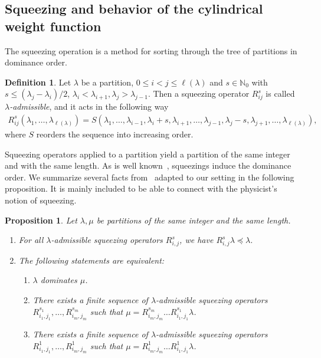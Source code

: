 \documentclass[letterpaper, DIV=17]{scrartcl}
\newtheorem{prop}[theorem]{Proposition}
\numberwithin{equation}{section}
\theoremstyle{definition}
\newtheorem{defn}{Definition}[section]
\begin{document}
\subsection{Squeezing and behavior of the cylindrical weight function}
% 
The squeezing operation is a method for sorting through the tree of partitions in dominance order.
%
\begin{defn}
Let $\lambda$ be a partition, $0\leq i <j \leq \ell(\lambda)$ and $s\in \mathbb{N}_0$ with $ s \leq (\lambda_j-\lambda_i)/2$, $\lambda_i<\lambda_{i+1}, \lambda_j >\lambda_{j-1}$. Then a squeezing operator $R_{ij}^s$ is called \emph{$\lambda$-admissible}, and it acts in the following way 
		\begin{align*}
			R_{ij}^s (\lambda_1, \dots, \lambda_{\ell(\lambda)})
			= S(\lambda_1, \dots, \lambda_{i-1}, \lambda_i+s, \lambda_{i+1}, \dots, \lambda_{j-1}, \lambda_j -s, \lambda_{j+1}, \dots, \lambda_{\ell(\lambda)}),
		\end{align*}
		where $S$ reorders the sequence into increasing order. 
\end{defn}
Squeezing operators applied to a partition yield a partition of the same integer and with the same length. As is well known~\cite[Ch. 1]{macdonald1995symmetric}, squeezings induce the dominance order. We summarize several facts from~\cite[Ch. 1]{macdonald1995symmetric} adapted to our setting in the following proposition. It is mainly included to be able to connect with the physicist's notion of squeezing. 
\begin{prop}\label{lm:characterization dominance order}
			Let $\lambda, \mu$ be partitions of the same integer and the same length. 		
			\begin{enumerate}
				\item For all  $ \lambda $-admissible squeezing operators $R_{i,j}^s$, we have 
				$	R_{i,j}^s \lambda \preceq \lambda $. 
				\item The following statements are equivalent:
				\begin{enumerate}
					\item $\lambda$ dominates $\mu$.
					\item There exists a finite sequence of  $ \lambda $-admissible squeezing operators
					$R_{i_1, j_1}^{s_1}, \dots, R_{i_m, j_m}^{s_m}$ such that
					$
						\mu = R_{i_m, j_m}^{s_m} \dots R_{i_1, j_1}^{s_1} \lambda $.
					\item There exists a finite sequence of  $ \lambda $-admissible squeezing operators
					$R_{i_1, j_1}^{1}, \dots, R_{i_m, j_m}^{1}$ such that
					$	\mu = R_{i_m, j_m}^{1} \dots R_{i_1, j_1}^{1} \lambda $.
				\end{enumerate}	
			\end{enumerate}	
		\end{prop}
\end{document}
